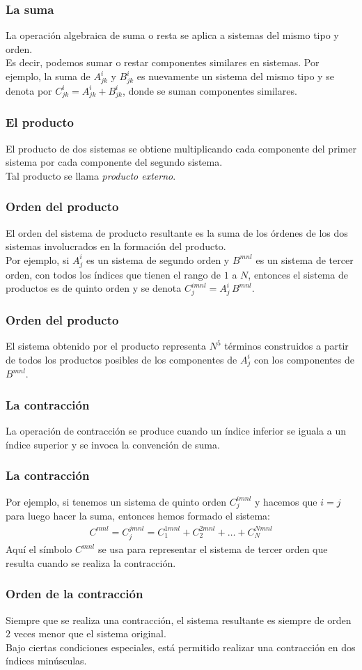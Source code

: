 \documentclass[12pt]{beamer}
\begin{document}
\begin{frame}
\frametitle{La suma}
La operación algebraica de suma o resta se aplica a sistemas del mismo tipo y orden.
\\
\bigskip
\pause
Es decir, podemos sumar o restar componentes similares en sistemas. Por ejemplo, la suma de $A_{jk}^{i}$ y $B_{jk}^{i}$ es nuevamente un sistema del mismo tipo y se denota por $C_{jk}^{i} = A_{jk}^{i} + B_{jk}^{i}$, donde se suman componentes similares.
\end{frame}
\begin{frame}
\frametitle{El producto}
El producto de dos sistemas se obtiene multiplicando cada componente del primer sistema por cada componente del segundo sistema.
\\
\bigskip
\pause
Tal producto se llama \emph{producto externo}.
\end{frame}
\begin{frame}
\frametitle{Orden del producto}
El orden del sistema de producto resultante es la suma de los órdenes de los dos sistemas involucrados en la formación del producto.
\\
\bigskip
\pause
Por ejemplo, si $A_{j}^{i}$ es un sistema de segundo orden y $B^{mnl}$ es un sistema de tercer orden, con todos los índices que tienen el rango de $1$ a $N$, entonces el sistema de productos es de quinto orden y se denota $C_{j}^{imnl} = A_{j}^{i} \, B^{mnl}$.
\end{frame}
\begin{frame}
\frametitle{Orden del producto}
El sistema obtenido por el producto representa $N^{5}$ términos construidos a partir de todos los productos posibles de los componentes de $A_{j}^{i}$ con los componentes de $B^{mnl}$.
\end{frame}
\begin{frame}
\frametitle{La contracción}
La operación de contracción se produce cuando un índice inferior se iguala a un índice superior y se invoca la convención de suma.
\end{frame}
\begin{frame}
\frametitle{La contracción}
Por ejemplo, si tenemos un sistema de quinto orden $C_{j}^{imnl}$ y hacemos que $i = j$ para luego hacer la suma, entonces hemos formado el sistema:
\begin{align*}
C^{mnl} = C_{j}^{jmnl} = C_{1}^{1mnl} + C_{2}^{2mnl} + \ldots + C_{N}^{Nmnl}
\end{align*}
Aquí el símbolo $C^{mnl}$ se usa para representar el sistema de tercer orden que resulta cuando se realiza la contracción.
\end{frame}
\begin{frame}
\frametitle{Orden de la contracción}
Siempre que se realiza una contracción, el sistema resultante es siempre de orden $2$ veces menor que el sistema original.
\\
\bigskip
\pause
Bajo ciertas condiciones especiales, está permitido realizar una contracción en dos índices minúsculas. 
\end{frame}
\end{document}
